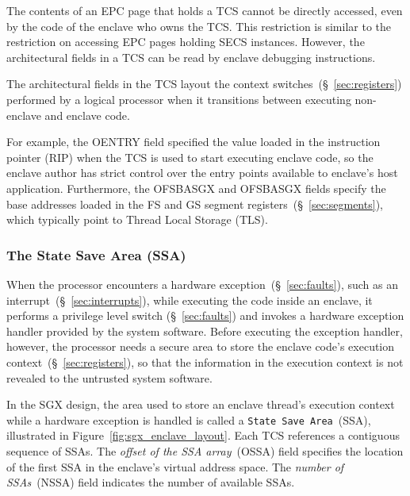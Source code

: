 
The contents of an EPC page that holds a TCS cannot be directly accessed, even
by the code of the enclave who owns the TCS. This restriction is similar to the
restriction on accessing EPC pages holding SECS instances. However, the
architectural fields in a TCS can be read by enclave debugging instructions.

The architectural fields in the TCS layout  the context
switches~(\S~\ref{sec:registers}) performed by a logical processor when it
transitions between executing non-enclave and enclave code.

For example, the OENTRY field specified the value loaded in the instruction
pointer (RIP) when the TCS is used to start executing enclave code, so the
enclave author has strict control over the entry points available to enclave's
host application. Furthermore, the OFSBASGX and OFSBASGX fields specify the
base addresses loaded in the FS and GS segment
registers~(\S~\ref{sec:segments}), which typically point to Thread Local
Storage (TLS).


\subsubsection{The State Save Area (SSA)}
\label{sec:sgx_ssa}



When the processor encounters a hardware exception~(\S~\ref{sec:faults}), such
as an interrupt~(\S~\ref{sec:interrupts}), while executing the code inside an
enclave, it performs a privilege level switch (\S~\ref{sec:faults}) and invokes
a hardware exception handler provided by the system software. Before executing
the exception handler, however, the processor needs a secure area to store the
enclave code's execution context~(\S~\ref{sec:registers}), so that the
information in the execution context is not revealed to the untrusted system
software.


In the SGX design, the area used to store an enclave thread's execution context
while a hardware exception is handled is called a \texttt{State Save
Area}~(SSA), illustrated in Figure~\ref{fig:sgx_enclave_layout}. Each TCS
references a contiguous sequence of SSAs. The \textit{offset of the SSA
array}~(OSSA) field specifies the location of the first SSA in the enclave's
virtual address space. The \textit{number of SSAs}~(NSSA) field indicates the
number of available SSAs.

